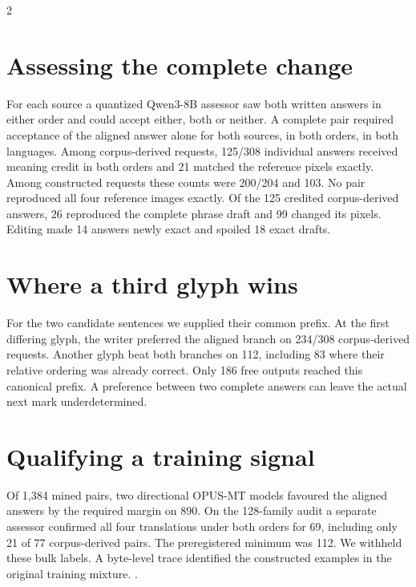 \begin{multicols}{2}
\section*{Assessing the complete change}
For each source a quantized Qwen3-8B assessor saw both written answers in either order and could accept either, both or neither. A complete pair required acceptance of the aligned answer alone for both sources, in both orders, in both languages. Among corpus-derived requests, 125/308 individual answers received meaning credit in both orders and 21 matched the reference pixels exactly. Among constructed requests these counts were 200/204 and 103. No pair reproduced all four reference images exactly.
Of the 125 credited corpus-derived answers, 26 reproduced the complete phrase draft and 99 changed its pixels. Editing made 14 answers newly exact and spoiled 18 exact drafts.
\section*{Where a third glyph wins}
For the two candidate sentences we supplied their common prefix. At the first differing glyph, the writer preferred the aligned branch on 234/308 corpus-derived requests. Another glyph beat both branches on 112, including 83 where their relative ordering was already correct. Only 186 free outputs reached this canonical prefix. A preference between two complete answers can leave the actual next mark underdetermined.
\section*{Qualifying a training signal}
Of 1,384 mined pairs, two directional OPUS-MT models favoured the aligned answers by the required margin on 890. On the 128-family audit a separate assessor confirmed all four translations under both orders for 69, including only 21 of 77 corpus-derived pairs. The preregistered minimum was 112. We withheld these bulk labels. A byte-level trace identified the constructed examples in the original training mixture. .
\end{multicols}
